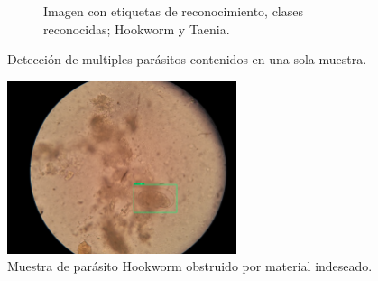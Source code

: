 \documentclass[letter,12pt]{report}
\begin{document}
\begin{figure}[H]
\begin{subfigure}{0.5\textwidth}
        \caption{Imagen con etiquetas de reconocimiento, clases reconocidas; Hookworm y
        Taenia.}
        \label{fig:cacafit}
    \end{subfigure}
    \caption{Detección de multiples parásitos contenidos en una sola muestra.}
    \label{fig:comparation_caca}
\end{figure}

\begin{figure}[ht]
    \centering
    \includegraphics[width=0.6\textwidth]{obstruction}
    \caption{Muestra de parásito Hookworm obstruido por material indeseado.}
    \label{fig:obstruction}
\end{figure}
\end{document}
